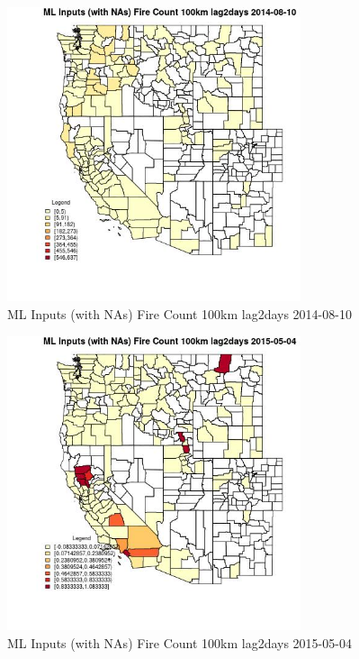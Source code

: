 \begin{figure} 
\centering  
\includegraphics[width=0.77\textwidth]{Code_Outputs/Report_ML_input_PM25_Step4_part_e_de_duplicated_aves_compiled_2019-05-18wNAs_CountyFire_Count_100km_lag2daysMean2014-08-10.jpg} 
\caption{\label{fig:Report_ML_input_PM25_Step4_part_e_de_duplicated_aves_compiled_2019-05-18wNAsCountyFire_Count_100km_lag2daysMean2014-08-10}ML Inputs (with NAs) Fire Count 100km lag2days 2014-08-10} 
\end{figure} 
 

\begin{figure} 
\centering  
\includegraphics[width=0.77\textwidth]{Code_Outputs/Report_ML_input_PM25_Step4_part_e_de_duplicated_aves_compiled_2019-05-18wNAs_CountyFire_Count_100km_lag2daysMean2015-05-04.jpg} 
\caption{\label{fig:Report_ML_input_PM25_Step4_part_e_de_duplicated_aves_compiled_2019-05-18wNAsCountyFire_Count_100km_lag2daysMean2015-05-04}ML Inputs (with NAs) Fire Count 100km lag2days 2015-05-04} 
\end{figure} 
 

